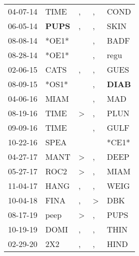 \begin{supertabular}{p{0.07\textwidth}p{0.06\textwidth}p{0.02\textwidth}p{0.02\textwidth}p{0.06\textwidth}}
 04-07-14\textsuperscript{} &           TIME\textsuperscript{} &                , &                , &           COND\textsuperscript{} \\
 06-05-14\textsuperscript{} &  \textbf{PUPS\textsuperscript{}} &                , &                , &           SKIN\textsuperscript{} \\
 08-08-14\textsuperscript{} &                            *OE1* &                  &                , &           BADF\textsuperscript{} \\
 08-28-14\textsuperscript{} &                            *OE1* &                  &                , &           regu\textsuperscript{} \\
 02-06-15\textsuperscript{} &           CATS\textsuperscript{} &                , &                , &           GUES\textsuperscript{} \\
 08-09-15\textsuperscript{} &                            *OS1* &                  &                , &  \textbf{DIAB\textsuperscript{}} \\
 04-06-16\textsuperscript{} &           MIAM\textsuperscript{} &                  &                , &            MAD\textsuperscript{} \\
 08-19-16\textsuperscript{} &           TIME\textsuperscript{} &     \textgreater &                , &           PLUN\textsuperscript{} \\
 09-09-16\textsuperscript{} &           TIME\textsuperscript{} &                  &                , &           GULF\textsuperscript{} \\
 10-22-16\textsuperscript{} &           SPEA\textsuperscript{} &                  &                  &                            *CE1* \\
 04-27-17\textsuperscript{} &           MANT\textsuperscript{} &     \textgreater &                , &           DEEP\textsuperscript{} \\
 05-27-17\textsuperscript{} &           ROC2\textsuperscript{} &     \textgreater &                , &           MIAM\textsuperscript{} \\
 11-04-17\textsuperscript{} &           HANG\textsuperscript{} &                , &                , &           WEIG\textsuperscript{} \\
 10-04-18\textsuperscript{} &           FINA\textsuperscript{} &                , &     \textgreater &            DBK\textsuperscript{} \\
 08-17-19\textsuperscript{} &           peep\textsuperscript{} &     \textgreater &                , &           PUPS\textsuperscript{} \\
 10-19-19\textsuperscript{} &           DOMI\textsuperscript{} &                , &                , &           THIN\textsuperscript{} \\
 02-29-20\textsuperscript{} &            2X2\textsuperscript{} &                , &                , &           HIND\textsuperscript{} \\
\end{supertabular}

